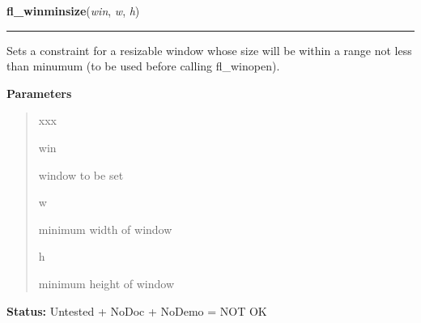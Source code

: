 \hspace{.8\funcindent}\begin{boxedminipage}{\funcwidth}

    \raggedright \textbf{fl\_winminsize}(\textit{win}, \textit{w}, \textit{h})

    \vspace{-1.5ex}

    \rule{\textwidth}{0.5\fboxrule}
\setlength{\parskip}{2ex}
    Sets a constraint for a resizable window whose size will be within a 
    range not less than minumum (to be used before calling fl\_winopen).

\setlength{\parskip}{1ex}
      \textbf{Parameters}
      \vspace{-1ex}

      \begin{quote}
        \begin{Ventry}{xxx}

          \item[win]

          window to be set

          \item[w]

          minimum width of window

          \item[h]

          minimum height of window

        \end{Ventry}

      \end{quote}

\textbf{Status:} Untested + NoDoc + NoDemo = NOT OK



    \end{boxedminipage}

    \label{xformslib:library:fl_winmaxsize}

    \vspace{0.5ex}

